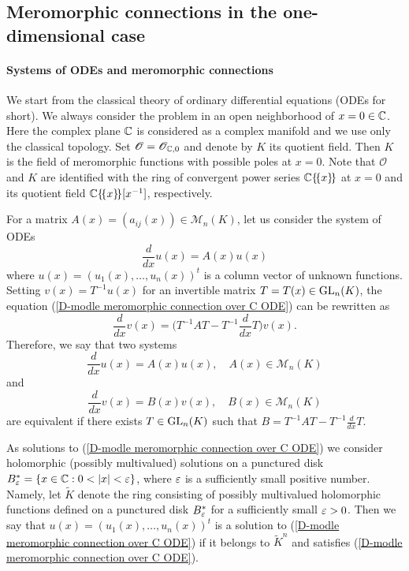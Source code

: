 \subsection{Meromorphic connections in the one-dimensional case}
\paragraph{Systems of ODEs and meromorphic connections}\label{D-module mero conn over C paragraph}
We start from the classical theory of ordinary differential equations (ODEs for short). We always consider the problem in an open neighborhood of $x=0\in\mathbb{C}$. Here the complex plane $\mathbb{C}$ is considered as a complex manifold and we use only the classical topology. Set $\mathscr{O}=\mathscr{O}_{\mathbb{C},0}$ and denote by $K$ its quotient field. Then $K$ is the field of meromorphic functions with possible poles at $x=0$. Note that $\mathscr{O}$ and $K$ are identified with the ring of convergent power series $\mathbb{C}\{\!\{x\}\!\}$ at $x=0$ and its quotient field $\mathbb{C}\{\!\{x\}\!\}[x^{-1}]$, respectively.\par
For a matrix $A(x)=(a_{ij}(x))\in\mathcal{M}_n(K)$, let us consider the system of ODEs
\begin{equation}\label{D-modle meromorphic connection over C ODE}
\frac{d}{dx}u(x)=A(x)u(x)
\end{equation}
where $u(x)=(u_1(x),\dots,u_n(x))^t$ is a column vector of unknown functions. Setting $v(x)=T^{-1}u(x)$ for an invertible matrix $T=T(x)\in\mathrm{GL}_n(K)$, the equation (\ref{D-modle meromorphic connection over C ODE}) can be rewritten as
\[\frac{d}{dx}v(x)=\Big(T^{-1}AT-T^{-1}\frac{d}{dx}T\Big)v(x).\]
Therefore, we say that two systems
\[\frac{d}{dx}u(x)=A(x)u(x),\quad A(x)\in\mathcal{M}_n(K)\]
and 
\[\frac{d}{dx}v(x)=B(x)v(x),\quad B(x)\in\mathcal{M}_n(K)\]
are equivalent if there exists $T\in\mathrm{GL}_n(K)$ such that $B=T^{-1}AT-T^{-1}\frac{d}{dx}T$.\par
As solutions to (\ref{D-modle meromorphic connection over C ODE}) we consider holomorphic (possibly multivalued) solutions on a punctured disk $B_\eps^*=\{x\in\C:0<|x|<\eps\}$, where $\varepsilon$ is a sufficiently small positive number. Namely, let $\widetilde{K}$ denote the ring consisting of possibly multivalued holomorphic functions defined on a punctured disk $B^*_\varepsilon$ for a sufficiently small $\varepsilon>0$. Then we say that $u(x)=(u_1(x),\dots,u_n(x))^t$ is a solution to (\ref{D-modle meromorphic connection over C ODE}) if it belongs to $\widetilde{K}^n$ and satisfies (\ref{D-modle meromorphic connection over C ODE}).\par
